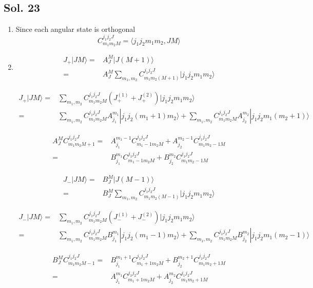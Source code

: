 \subsection*{Sol. 23}
\begin{enumerate}
    \item Since each angular state is orthogonal
    $$
    C^{j_1j_2J}_{m_1m_2M}
    =\langle j_1j_2m_1m_2, JM\rangle
    $$
    \item 
    \begin{align*}
        J_+|JM\rangle
        =&A_J^M|J(M+1)\rangle\\
        =&
        A_J^M
        \sum_{m_1,m_2}C^{j_1j_2J}_{m_1m_2(M+1)}|j_1j_2m_1m_2\rangle
    \end{align*}
    
    \begin{align*}
        J_+|JM\rangle
        =&\sum_{m_1,m_2}
         C^{j_1j_2J}_{m_1m_2M}
         (J_+^{(1)}+J_+^{(2)})|j_1j_2m_1m_2\rangle\\
         =&
         \sum_{m_1,m_2}
         C^{j_1j_2J}_{m_1m_2M}
         A_{j_1}^{m_1}|j_1j_2(m_1+1)m_2\rangle
         +\sum_{m_1,m_2}
         C^{j_1j_2J}_{m_1m_2M}
         A_{j_2}^{m_2}|j_1j_2m_1(m_2+1)\rangle
    \end{align*}

    \begin{align*}
        A^M_J C^{j_1j_2J}_{m_1m_2M+1}
    =&A^{m_1-1}_{j_1}C^{j_1j_2J}_{m_1-1m_2M} + A^{m_2-1}_{j_2}C^{j_1j_2J}_{m_1m_2-1M}\\
    =&
    B^{m_1}_{j_1}C^{j_1j_2J}_{m_1-1m_2M} + B^{m_2}_{j_2}C^{j_1j_2J}_{m_1m_2-1M}
    \end{align*}

    \begin{align*}
        J_-|JM\rangle
        =&B_J^M|J(M-1)\rangle\\
        =&
        B_J^M
        \sum_{m_1,m_2}C^{j_1j_2J}_{m_1m_2(M-1)}|j_1j_2m_1m_2\rangle
    \end{align*}
    
    \begin{align*}
        J_-|JM\rangle
        =&\sum_{m_1,m_2}
         C^{j_1j_2J}_{m_1m_2M}
         (J_-^{(1)}+J_-^{(2)})|j_1j_2m_1m_2\rangle\\
         =&
         \sum_{m_1,m_2}
         C^{j_1j_2J}_{m_1m_2M}
         B_{j_1}^{m_1}|j_1j_2(m_1-1)m_2\rangle
         +\sum_{m_1,m_2}
         C^{j_1j_2J}_{m_1m_2M}
         B_{j_2}^{m_2}|j_1j_2m_1(m_2-1)\rangle
    \end{align*}

    \begin{align*}
        B^M_J C^{j_1j_2J}_{m_1m_2M-1}
    =&B^{m_1+1}_{j_1}C^{j_1j_2J}_{m_1+1m_2M} 
    + B^{m_2+1}_{j_2}C^{j_1j_2J}_{m_1m_2+1M}\\
    =&
    A^{m_1}_{j_1}C^{j_1j_2J}_{m_1+1m_2M} + A^{m_2}_{j_2}C^{j_1j_2J}_{m_1m_2+1M}
    \end{align*}
\end{enumerate}

